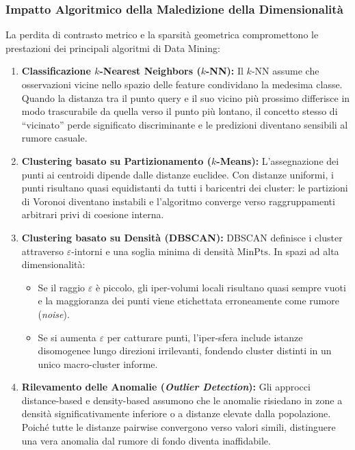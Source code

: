 \subsubsection{Impatto Algoritmico della Maledizione della Dimensionalità}
La perdita di contrasto metrico e la sparsità geometrica compromettono le prestazioni dei principali algoritmi di Data Mining:
\begin{enumerate}
    \item \textbf{Classificazione $k$-Nearest Neighbors ($k$-NN):} Il $k$-NN assume che osservazioni vicine nello spazio delle feature condividano la medesima classe. Quando la distanza tra il punto query e il suo vicino più prossimo differisce in modo trascurabile da quella verso il punto più lontano, il concetto stesso di ``vicinato'' perde significato discriminante e le predizioni diventano sensibili al rumore casuale.
    \item \textbf{Clustering basato su Partizionamento ($k$-Means):} L'assegnazione dei punti ai centroidi dipende dalle distanze euclidee. Con distanze uniformi, i punti risultano quasi equidistanti da tutti i baricentri dei cluster: le partizioni di Voronoi diventano instabili e l'algoritmo converge verso raggruppamenti arbitrari privi di coesione interna.
    \item \textbf{Clustering basato su Densità (DBSCAN):} DBSCAN definisce i cluster attraverso $\varepsilon$-intorni e una soglia minima di densità $\text{MinPts}$. In spazi ad alta dimensionalità:
    \begin{itemize}
        \item Se il raggio $\varepsilon$ è piccolo, gli iper-volumi locali risultano quasi sempre vuoti e la maggioranza dei punti viene etichettata erroneamente come rumore (\textit{noise}).
        \item Se si aumenta $\varepsilon$ per catturare punti, l'iper-sfera include istanze disomogenee lungo direzioni irrilevanti, fondendo cluster distinti in un unico macro-cluster informe.
    \end{itemize}
    \item \textbf{Rilevamento delle Anomalie (\textit{Outlier Detection}):} Gli approcci distance-based e density-based assumono che le anomalie risiedano in zone a densità significativamente inferiore o a distanze elevate dalla popolazione. Poiché tutte le distanze pairwise convergono verso valori simili, distinguere una vera anomalia dal rumore di fondo diventa inaffidabile.
\end{enumerate}

